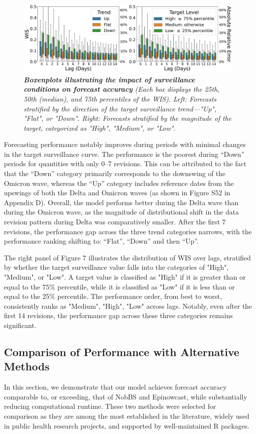 \begin{figure}[h!]
    \centering
    \includegraphics[width=\textwidth]{figs/experiment_fraction_result_factors.pdf}
    \caption{\emph{\textbf{Boxenplots illustrating the impact of surveillance conditions on forecast accuracy} (Each box displays the 25th, 50th (median), and 75th percentiles of the WIS). Left: Forecasts stratified by the direction of the target surveillance trend—"Up", "Flat", or "Down". Right: Forecasts stratified by the magnitude of the target, categorized as "High", "Medium", or "Low".}}
\end{figure}

Forecasting performance notably improves during periods with minimal changes in the target surveillance curve. The performance is the poorest during “Down” periods for quantities with only 0–7 revisions. This can be attributed to the fact that the “Down” category primarily corresponds to the downswing of the Omicron wave, whereas the “Up” category includes reference dates from the upswings of both the Delta and Omicron waves (as shown in Figure S52 in Appendix D). Overall, the model performs better during the Delta wave than during the Omicron wave, as the magnitude of distributional shift in the data revision pattern during Delta was comparatively smaller. After the first 7 revisions, the performance gap across the three trend categories narrows, with the performance ranking shifting to: “Flat”, “Down” and then “Up”.

The right panel of Figure 7 illustrates the distribution of WIS over lags, stratified by whether the target surveillance value falls into the categories of "High", "Medium", or "Low". A target value is classified as "High" if it is greater than or equal to the 75\% percentile, while it is classified as "Low" if it is less than or equal to the 25\% percentile. The performance order, from best to worst, consistently ranks as "Medium", "High", "Low" across lags. Notably, even after the first 14 revisions, the performance gap across these three categories remains significant.


\subsection{Comparison of Performance with Alternative Methods}
In this section, we demonstrate that our model achieves forecast accuracy comparable to, or exceeding, that of NobBS\cite{McGough2020} and Epinowcast\cite{epinowcast}, while substantially reducing computational runtime. These two methods were selected for comparison as they are among the most established in the literature, widely used in public health research projects, and supported by well-maintained R packages.

